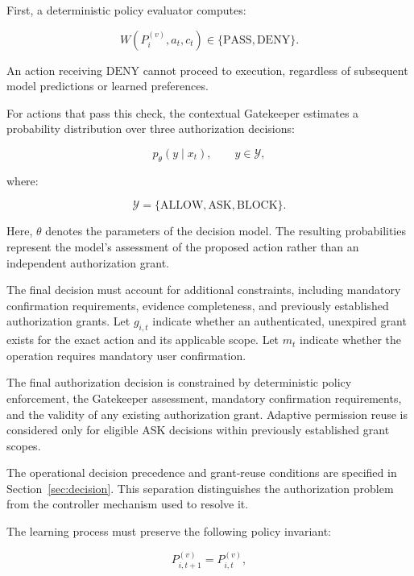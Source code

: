 \documentclass[10pt,conference]{IEEEtran}
\begin{document}
First, a deterministic policy evaluator computes:

\begin{equation}
W(P_i^{(v)},a_t,c_t)
\in \{\mathrm{PASS},\mathrm{DENY}\}.
\end{equation}

An action receiving $\mathrm{DENY}$ cannot proceed to execution, regardless of subsequent model predictions or learned preferences.

For actions that pass this check, the contextual Gatekeeper estimates a probability distribution over three authorization decisions:

\begin{equation}
p_{\theta}(y \mid x_t),
\qquad
y \in \mathcal{Y},
\end{equation}

where:

\begin{equation}
\mathcal{Y} =
\{\mathrm{ALLOW},\mathrm{ASK},\mathrm{BLOCK}\}.
\end{equation}

Here, $\theta$ denotes the parameters of the decision model. The resulting probabilities represent the model's assessment of the proposed action rather than an independent authorization grant.

The final decision must account for additional constraints, including mandatory confirmation requirements, evidence completeness, and previously established authorization grants. Let $g_{i,t}$ indicate whether an authenticated, unexpired grant exists for the exact action and its applicable scope. Let $m_t$ indicate whether the operation requires mandatory user confirmation.

The final authorization decision is constrained
by deterministic policy enforcement, the
Gatekeeper assessment, mandatory confirmation
requirements, and the validity of any existing
authorization grant. Adaptive permission reuse
is considered only for eligible ASK decisions
within previously established grant scopes.

The operational decision precedence and
grant-reuse conditions are specified in
Section~\ref{sec:decision}. This separation
distinguishes the authorization problem from
the controller mechanism used to resolve it.

The learning process must preserve the following policy invariant:

\begin{equation}
P_{i,t+1}^{(v)} = P_{i,t}^{(v)},
\end{equation}
\end{document}
